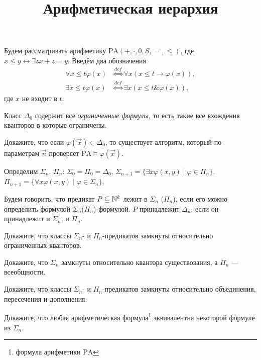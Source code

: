 \documentclass[a4paper, 12pt, num=Г2]{listok}
\renewcommand{\phi}{\varphi}
\begin{document}
\title{Арифметическая иерархия}
\maketitle
Будем рассматривать арифметику $\mathrm{PA}(+, \cdot, 0, S, =, \le)$,
где $x \le y \leftrightarrow \exists z x + z = y$.
Введём два обозначения
\begin{align*}
	\forall{ x \le t }\phi(x) & \stackrel{def}{\Leftrightarrow} \forall x (x \le t \to \phi(x)), \\
	\exists{ x \le t }\phi(x) & \stackrel{def}{\Leftrightarrow} \exists x (x \le t \&  \phi(x)),
\end{align*}
где $x$ не входит в $t$.
\begin{definition}
	Класс $\Delta_0$ содержит все \textit{ограниченные формулы},
	то есть такие все вхождения кванторов в которые ограничены.
\end{definition}
\begin{problem}
	Докажите, что если $\phi(\vec x) \in \Delta_0$, то существует алгоритм,
	который по параметрам $\vec n$ проверяет $\mathrm{PA} \models \phi(\vec x)$.
\end{problem}
\begin{definition}
	Определим $\Sigma_n$, $\Pi_n$:
	$\Sigma_0 = \Pi_0 = \Delta_0$,
	$\Sigma_{n + 1} = \{ \exists x \phi(x, y) \mid \phi \in \Pi_n \}$,
	$\Pi_{n + 1} = \{ \forall x \phi(x, y) \mid \phi \in \Sigma_n \}$,
\end{definition}
\begin{definition}
	Будем говорить, что предикат $P \subseteq \mathbb{N}^k$ лежит в $\Sigma_n$ ($\Pi_n$),
	если его можно определить формулой $\Sigma_n$($\Pi_n$)-формулой.
	$P$ принадлежит $\Delta_n$, если он принадлежит и $\Sigma_n$, и $\Pi_n$.
\end{definition}
\begin{problem}
	Докажите, что классы $\Sigma_n$- и $\Pi_n$-предикатов замкнуты относительно ограниченных кванторов.
\end{problem}
\begin{problem}
	Докажите, что $\Sigma_n$ замкнуты относительно квантора существования, а $\Pi_n$ --- всеобщности.
\end{problem}
\begin{problem}
	Докажите, что классы $\Sigma_n$- и $\Pi_n$-предикатов замкнуты относительно объединения, пересечения и дополнения.
\end{problem}
\begin{problem}
	Докажите, что любая арифметическая формула\footnote{формула арифметики $\mathrm{PA}$} эквивалентна некоторой формуле из $\Sigma_n$.
\end{problem}
\end{document}
